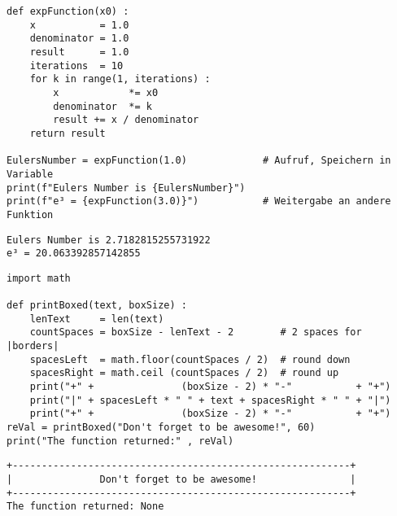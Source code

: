 \begin{frame}[fragile]
%
\begin{codebox}
\begin{verbatim}
def expFunction(x0) :
    x           = 1.0
    denominator = 1.0
    result      = 1.0
    iterations  = 10
    for k in range(1, iterations) :
        x            *= x0
        denominator  *= k
        result += x / denominator
    return result

EulersNumber = expFunction(1.0)             # Aufruf, Speichern in Variable
print(f"Eulers Number is {EulersNumber}")
print(f"e³ = {expFunction(3.0)}")           # Weitergabe an andere Funktion
\end{verbatim}
\end{codebox}

\begin{cmdbox}
\begin{verbatim}
Eulers Number is 2.7182815255731922
e³ = 20.063392857142855
\end{verbatim}
\end{cmdbox}
%
\end{frame}


\begin{frame}[fragile]
%
\begin{codebox}
\begin{verbatim}
import math

def printBoxed(text, boxSize) :
    lenText     = len(text)
    countSpaces = boxSize - lenText - 2        # 2 spaces for |borders|
    spacesLeft  = math.floor(countSpaces / 2)  # round down
    spacesRight = math.ceil (countSpaces / 2)  # round up
    print("+" +               (boxSize - 2) * "-"           + "+")
    print("|" + spacesLeft * " " + text + spacesRight * " " + "|")
    print("+" +               (boxSize - 2) * "-"           + "+")
reVal = printBoxed("Don't forget to be awesome!", 60)
print("The function returned:" , reVal)
\end{verbatim}
\end{codebox}

\begin{cmdbox}
\begin{verbatim}
+----------------------------------------------------------+
|               Don't forget to be awesome!                |
+----------------------------------------------------------+
The function returned: None
\end{verbatim}
\end{cmdbox}
%
\end{frame}

